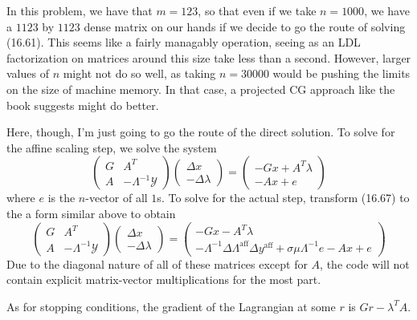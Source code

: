 \documentclass{article}
\newcommand{\openm}{\begin{pmatrix}}
\newcommand{\closem}{\end{pmatrix}}
\begin{document}
In this problem, we have that $m=123$, so that even if we take $n=1000$, we have a $1123$ by $1123$ dense matrix on our hands if we decide to go the route of solving (16.61). This seems like a fairly managably operation, seeing as an LDL factorization on matrices around this size take less than a second. However, larger values of $n$ might not do so well, as taking $n=30000$ would be pushing the limits on the size of machine memory. In that case, a projected CG approach like the book suggests might do better.

Here, though, I'm just going to go the route of the direct solution. To solve for the affine scaling step, we solve the system
\[\openm G&A^T\\A&-\Lambda^{-1}\mathscr{Y}\closem\openm\Delta x\\-\Delta\lambda\closem=\openm -Gx+A^T\lambda\\-Ax+e\closem\]
where $e$ is the $n$-vector of all $1$s. To solve for the actual step, transform (16.67) to the a form similar above to obtain
\[\openm G&A^T\\A&-\Lambda^{-1}\mathscr{Y}\closem\openm\Delta x\\-\Delta\lambda\closem=\openm-Gx-A^T\lambda\\-\Lambda^{-1}\Delta\Lambda^\text{aff}\Delta y^\text{aff}+\sigma\mu\Lambda^{-1}e-Ax+e\closem\]
Due to the diagonal nature of all of these matrices except for $A$, the code will not contain explicit matrix-vector multiplications for the most part.

As for stopping conditions, the gradient of the Lagrangian at some $r$ is $Gr - \lambda^T A$. 
\end{document}
